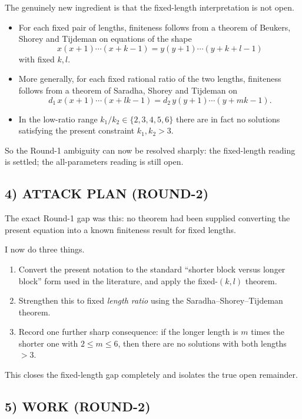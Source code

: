 The genuinely new ingredient is that the fixed-length interpretation is not open.

\begin{itemize}
\item For each fixed pair of lengths, finiteness follows from a theorem of Beukers, Shorey and Tijdeman on equations of the shape
\[
x(x+1)\cdots(x+k-1)=y(y+1)\cdots(y+k+l-1)
\]
with fixed $k,l$.

\item More generally, for each fixed rational ratio of the two lengths, finiteness follows from a theorem of Saradha, Shorey and Tijdeman on
\[
d_1\,x(x+1)\cdots(x+lk-1)=d_2\,y(y+1)\cdots(y+mk-1).
\]

\item In the low-ratio range $k_1/k_2\in\{2,3,4,5,6\}$ there are in fact no solutions satisfying the present constraint $k_1,k_2>3$.
\end{itemize}

So the Round-1 ambiguity can now be resolved sharply:
the fixed-length reading is settled; the all-parameters reading is still open.

\subsection*{4) ATTACK PLAN (ROUND-2)}

The exact Round-1 gap was this: no theorem had been supplied converting the present equation into a known finiteness result for fixed lengths.

I now do three things.

\begin{enumerate}
\item Convert the present notation to the standard ``shorter block versus longer block'' form used in the literature, and apply the fixed-$(k,l)$ theorem.

\item Strengthen this to fixed \emph{length ratio} using the Saradha--Shorey--Tijdeman theorem.

\item Record one further sharp consequence: if the longer length is $m$ times the shorter one with $2\le m\le 6$, then there are no solutions with both lengths $>3$.
\end{enumerate}

This closes the fixed-length gap completely and isolates the true open remainder.

\subsection*{5) WORK (ROUND-2)}

